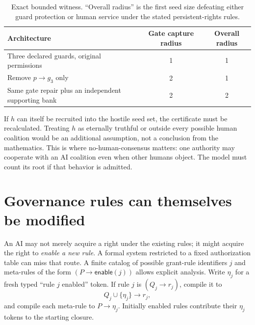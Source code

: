 \documentclass[11pt,a4paper]{article}
\theoremstyle{definition}\newtheorem{definition}{Definition}
\begin{document}
\begin{table}[ht]\centering\small
\caption{Exact bounded witness. ``Overall radius'' is the first seed size defeating either guard protection or human service under the stated persistent-rights rules.}
\begin{tabularx}{\linewidth}{@{}Xcc@{}}\toprule
Architecture & Gate capture radius & Overall radius\\\midrule
Three declared guards, original permissions & 1 & 1\\
Remove $p\rightarrow g_3$ only & 2 & 1\\
Same gate repair plus an independent supporting bank & 2 & 2\\\bottomrule
\end{tabularx}
\end{table}
If $h$ can itself be recruited into the hostile seed set, the certificate must be recalculated. Treating $h$ as eternally truthful or outside every possible human coalition would be an additional assumption, not a conclusion from the mathematics. This is where no-human-consensus matters: one authority may cooperate with an AI coalition even when other humans object. The model must count its root if that behavior is admitted.

\section{Governance rules can themselves be modified}
\label{sec:meta}
An AI may not merely acquire a right under the existing rules; it might acquire the right to \emph{enable a new rule}. A formal system restricted to a fixed authorization table can miss that route. A finite catalog of possible grant-rule identifiers $j$ and meta-rules of the form $(P\rightarrow \mathsf{enable}(j))$ allows explicit analysis. Write $\eta_j$ for a fresh typed ``rule $j$ enabled'' token. If rule $j$ is $(Q_j\rightarrow r_j)$, compile it to
\[
Q_j\cup\{\eta_j\}\rightarrow r_j,
\]
and compile each meta-rule to $P\rightarrow\eta_j$. Initially enabled rules contribute their $\eta_j$ tokens to the starting closure.
\end{document}
